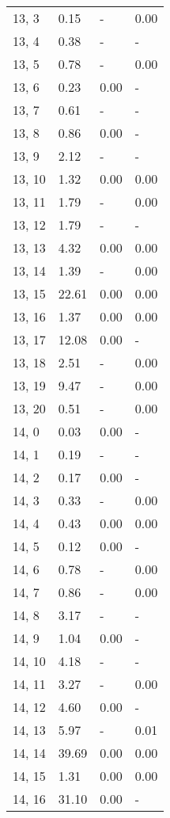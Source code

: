 \begin{table}
\begin{tabular}{llll}
13, 3  &    0.15 &     - &  0.00 \\
13, 4  &    0.38 &     - &     - \\
13, 5  &    0.78 &     - &  0.00 \\
13, 6  &    0.23 &  0.00 &     - \\
13, 7  &    0.61 &     - &     - \\
13, 8  &    0.86 &  0.00 &     - \\
13, 9  &    2.12 &     - &     - \\
13, 10 &    1.32 &  0.00 &  0.00 \\
13, 11 &    1.79 &     - &  0.00 \\
13, 12 &    1.79 &     - &     - \\
13, 13 &    4.32 &  0.00 &  0.00 \\
13, 14 &    1.39 &     - &  0.00 \\
13, 15 &   22.61 &  0.00 &  0.00 \\
13, 16 &    1.37 &  0.00 &  0.00 \\
13, 17 &   12.08 &  0.00 &     - \\
13, 18 &    2.51 &     - &  0.00 \\
13, 19 &    9.47 &     - &  0.00 \\
13, 20 &    0.51 &     - &  0.00 \\
14, 0  &    0.03 &  0.00 &     - \\
14, 1  &    0.19 &     - &     - \\
14, 2  &    0.17 &  0.00 &     - \\
14, 3  &    0.33 &     - &  0.00 \\
14, 4  &    0.43 &  0.00 &  0.00 \\
14, 5  &    0.12 &  0.00 &     - \\
14, 6  &    0.78 &     - &  0.00 \\
14, 7  &    0.86 &     - &  0.00 \\
14, 8  &    3.17 &     - &     - \\
14, 9  &    1.04 &  0.00 &     - \\
14, 10 &    4.18 &     - &     - \\
14, 11 &    3.27 &     - &  0.00 \\
14, 12 &    4.60 &  0.00 &     - \\
14, 13 &    5.97 &     - &  0.01 \\
14, 14 &   39.69 &  0.00 &  0.00 \\
14, 15 &    1.31 &  0.00 &  0.00 \\
14, 16 &   31.10 &  0.00 &     - \\

\end{tabular}
\end{table}
